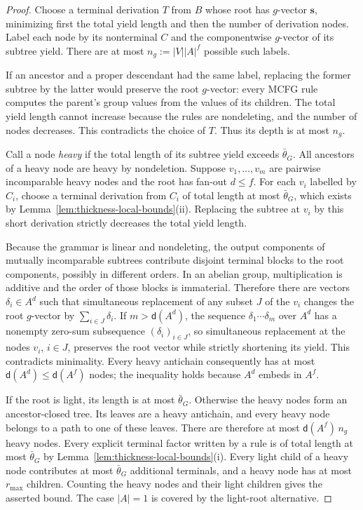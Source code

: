 \begin{proof}
Choose a terminal derivation $T$ from $B$ whose
root has $g$-vector $\mathbf s$, minimizing
first the total yield length and then the number
of derivation nodes. Label each node by its
nonterminal $C$ and the componentwise $g$-vector
of its subtree yield. There are at most
$n_g:=|V||A|^f$ possible such labels.

If an ancestor and a proper descendant had
the same label, replacing the former subtree
by the latter would preserve the root
$g$-vector: every MCFG rule computes the
parent's group values from the values of its
children. The total yield length cannot
increase because the rules are nondeleting,
and the number of nodes decreases.
This contradicts the choice of $T$.
Thus its depth is at most $n_g$.

Call a node \emph{heavy} if the total length
of its subtree yield exceeds $\bar\theta_G$.
All ancestors of a heavy node are heavy
by nondeletion. Suppose $v_1,\ldots,v_m$
are pairwise incomparable heavy nodes and
the root has fan-out $d\le f$.
For each $v_i$ labelled by $C_i$,
choose a terminal derivation from $C_i$
of total length at most $\bar\theta_G$,
which exists by
Lemma~\ref{lem:thickness-local-bounds}(ii).
Replacing the subtree at $v_i$ by this
short derivation strictly decreases the
total yield length.

Because the grammar is linear and nondeleting,
the output components of mutually incomparable
subtrees contribute disjoint terminal blocks
to the root components, possibly in different
orders. In an abelian group, multiplication
is additive and the order of those blocks is
immaterial. Therefore there are vectors
$\delta_i\in A^d$ such that simultaneous
replacement of any subset $J$ of the $v_i$
changes the root $g$-vector by
$\sum_{i\in J}\delta_i$.
If $m>\mathsf d(A^d)$, the sequence
$\delta_1\cdots\delta_m$ over $A^d$ has a nonempty
zero-sum subsequence $(\delta_i)_{i\in J}$, so
simultaneous replacement at the nodes $v_i$,
$i\in J$, preserves the root
vector while strictly shortening its yield.
This contradicts minimality. Every heavy
antichain consequently has at most
$\mathsf d(A^d)\le\mathsf d(A^f)$ nodes; the
inequality holds because $A^d$ embeds in $A^f$.

If the root is light, its length is at most
$\bar\theta_G$. Otherwise the heavy nodes
form an ancestor-closed tree. Its leaves
are a heavy antichain, and every heavy node
belongs to a path to one of these leaves.
There are therefore at most
$\mathsf d(A^f)\,n_g$ heavy nodes.
Every explicit terminal factor written by
a rule is of total length at most
$\bar\theta_G$ by
Lemma~\ref{lem:thickness-local-bounds}(i).
Every light child of a heavy node contributes
at most $\bar\theta_G$ additional terminals,
and a heavy node has at most $r_{\max}$
children. Counting the heavy nodes and their
light children gives the asserted bound.
The case $|A|=1$ is covered by the light-root
alternative.
\end{proof}

